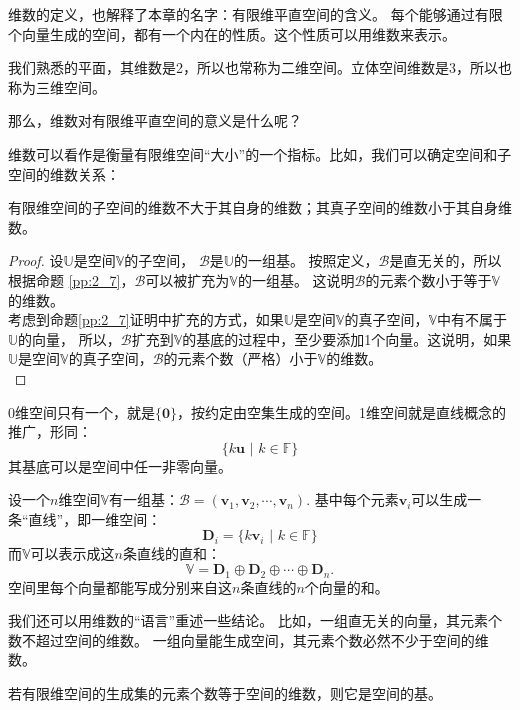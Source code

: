 \documentclass[12pt,UTF8]{ctexbook}
\begin{document}
维数的定义，也解释了本章的名字：有限维平直空间的含义。
每个能够通过有限个向量生成的空间，都有一个内在的性质。这个性质可以用维数来表示。

我们熟悉的平面，其维数是2，所以也常称为二维空间。立体空间维数是3，所以也称为三维空间。

那么，维数对有限维平直空间的意义是什么呢？

维数可以看作是衡量有限维空间“大小”的一个指标。比如，我们可以确定空间和子空间的维数关系：

\begin{pp}\label{pp:2_10}
    有限维空间的子空间的维数不大于其自身的维数；其真子空间的维数小于其自身维数。
\end{pp}

\begin{proof} %
    设$\mathbb{U}$是空间$\mathbb{V}$的子空间，
    $\mathcal{B}$是$\mathbb{U}$的一组基。
    按照定义，$\mathcal{B}$是直无关的，所以根据命题 \ref{pp:2_7}，$\mathcal{B}$可以被扩充为$\mathbb{V}$的一组基。 
    这说明$\mathcal{B}$的元素个数小于等于$\mathbb{V}$的维数。\\
    考虑到命题\ref{pp:2_7}证明中扩充的方式，如果$\mathbb{U}$是空间$\mathbb{V}$的真子空间，$\mathbb{V}$中有不属于$\mathbb{U}$的向量，
    所以，$\mathcal{B}$扩充到$\mathbb{V}$的基底的过程中，至少要添加1个向量。这说明，如果$\mathbb{U}$是空间$\mathbb{V}$的真子空间，$\mathcal{B}$的元素个数（严格）小于$\mathbb{V}$的维数。\\
\end{proof}


0维空间只有一个，就是$\{\mathbf{0}\}$，按约定由空集生成的空间。1维空间就是直线概念的推广，形同：
$$ \{k\mathbf{u}\,\,|\,\,k\in\mathbb{F}\}$$
其基底可以是空间中任一非零向量。

设一个$n$维空间$\mathbb{V}$有一组基：$ \mathcal{B} = (\mathbf{v}_1, \mathbf{v}_2, \cdots , \mathbf{v}_n )$.
基中每个元素$\mathbf{v}_i$可以生成一条“直线”，即一维空间：
$$ \mathbf{D}_i =  \{k\mathbf{v}_i\,\,|\,\,k\in\mathbb{F}\}$$
而$\mathbb{V}$可以表示成这$n$条直线的直和：
$$\mathbb{V} = \mathbf{D}_1 \oplus \mathbf{D}_2 \oplus \cdots \oplus \mathbf{D}_n. $$
空间里每个向量都能写成分别来自这$n$条直线的$n$个向量的和。

我们还可以用维数的“语言”重述一些结论。
比如，一组直无关的向量，其元素个数不超过空间的维数。
一组向量能生成空间，其元素个数必然不少于空间的维数。

\begin{pp}\label{pp:2_11}
    若有限维空间的生成集的元素个数等于空间的维数，则它是空间的基。
\end{pp}
\end{document}
